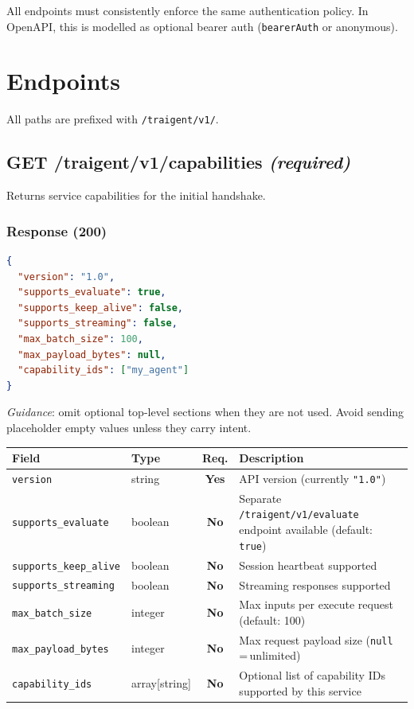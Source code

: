 \documentclass[11pt,a4paper]{article}
\newcommand{\field}[1]{\texttt{#1}}
\newcommand{\required}{\textbf{Yes}}
\newcommand{\optional}{\textbf{No}}
\newcommand{\status}[1]{\texttt{"#1"}}
\begin{document}
All endpoints must consistently enforce the same authentication policy.
In OpenAPI, this is modelled as optional bearer auth (\texttt{bearerAuth} or anonymous).

\section{Endpoints}\label{sec:endpoints}

All paths are prefixed with \texttt{/traigent/v1/}.

\subsection{GET /traigent/v1/capabilities \normalfont\textit{(required)}}

Returns service capabilities for the initial handshake.

\subsubsection{Response (200)}

\begin{lstlisting}[language=json]
{
  "version": "1.0",
  "supports_evaluate": true,
  "supports_keep_alive": false,
  "supports_streaming": false,
  "max_batch_size": 100,
  "max_payload_bytes": null,
  "capability_ids": ["my_agent"]
}
\end{lstlisting}

\textit{Guidance}: omit optional top-level sections when they are not used.
Avoid sending placeholder empty values unless they carry intent.

\begin{center}\small
\begin{tabularx}{\textwidth}{@{}llcX@{}}
\toprule
\textbf{Field} & \textbf{Type} & \textbf{Req.} & \textbf{Description} \\
\midrule
\field{version}              & string  & \required & API version (currently \status{1.0}) \\
\field{supports\_evaluate}   & boolean & \optional & Separate \texttt{/traigent/v1/evaluate} endpoint available (default: \texttt{true}) \\
\field{supports\_keep\_alive}& boolean & \optional & Session heartbeat supported \\
\field{supports\_streaming}  & boolean & \optional & Streaming responses supported \\
\field{max\_batch\_size}     & integer & \optional & Max inputs per execute request (default: 100) \\
\field{max\_payload\_bytes}  & integer & \optional & Max request payload size (\texttt{null}\,=\,unlimited) \\
\field{capability\_ids}      & array[string] & \optional & Optional list of capability IDs supported by this service \\
\bottomrule
\end{tabularx}
\end{center}
\end{document}
